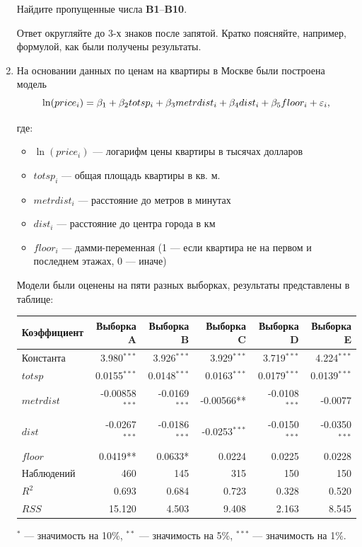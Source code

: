 \documentclass[12pt, a4paper]{article}\usepackage[]{graphicx}\usepackage[]{color}
\begin{document}
\begin{enumerate}
Найдите пропущенные числа \textbf{B1}--\textbf{B10}.

Ответ округляйте до 3-х знаков после запятой. Кратко поясняйте, например, формулой, как были получены результаты.


\item На основании данных по ценам на квартиры в Москве были построена модель
\[
\ln(price_i)=\beta_1 + \beta_2 totsp_i + \beta_3 metrdist_i + \beta_4 dist_i +\beta_5 floor_i +\varepsilon_i,
\]

где:
\begin{itemize}
\item $\ln(price_i)$ — логарифм цены квартиры в тысячах долларов
\item $totsp_i$ — общая площадь квартиры в кв. м.
\item $metrdist_i$ — расстояние до метров в минутах
\item $dist_i$ — расстояние до центра города в км
\item $floor_i$ — дамми-переменная (1 — если квартира не на первом и последнем этажах, 0 — иначе)
\end{itemize}

Модели были оценены на пяти разных выборках, результаты представлены в таблице:


\begin{tabular}{lrrrrr} \toprule
Коэффициент & Выборка A & Выборка B & Выборка C & Выборка D & Выборка E \\
\midrule
Константа & 3.980$^{***}$ & 3.926$^{***}$ & 3.929$^{***}$ & 3.719$^{***}$ & 4.224$^{***}$ \\
$totsp$ & 0.0155$^{***}$ & 0.0148$^{***}$ & 0.0163$^{***}$ & 0.0179$^{***}$ & 0.0139$^{***}$ \\
$metrdist$ & -0.00858$^{***}$ & -0.0169$^{***}$ & -0.00566** & -0.0108$^{***}$ & -0.0077 \\
$dist$ & -0.0267$^{***}$ & -0.0186$^{***}$ & -0.0253$^{***}$ & -0.0150$^{***}$ & -0.0350$^{***}$ \\
$floor$ & 0.0419** & 0.0633* & 0.0224 & 0.0225 & 0.0228 \\
Наблюдений & 460 & 145 & 315 & 150 & 150 \\
$R^2$ & 0.693 & 0.684 & 0.723 & 0.328 & 0.520 \\
$RSS$ & 15.120 & 4.503 & 9.408 & 2.163 & 8.545 \\
\bottomrule
\end{tabular}

$^{*}$ — значимость на 10\%, $^{**}$ — значимость на 5\%, $^{***}$ — значимость на 1\%.



\end{enumerate}
\end{document}
